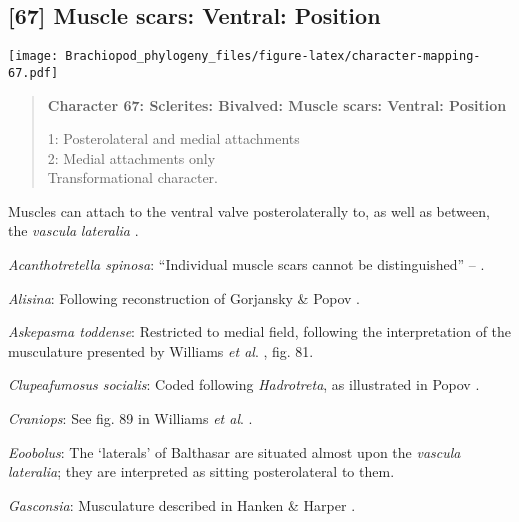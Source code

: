\documentclass[openany]{book}
\theoremstyle{definition}
\theoremstyle{definition}
\theoremstyle{definition}
\theoremstyle{remark}
\begin{document}
\subsection*{{[}67{]} Muscle scars: Ventral:
Position}\label{muscle-scars-ventral-position}

\texttt{[image: Brachiopod\_phylogeny\_files/figure-latex/character-mapping-67.pdf]}

\begin{quote}
\textbf{Character 67: Sclerites: Bivalved: Muscle scars: Ventral:
Position}

1: Posterolateral and medial attachments\\
2: Medial attachments only\\
Transformational character.
\end{quote}

Muscles can attach to the ventral valve posterolaterally to, as well as
between, the \emph{vascula} \emph{lateralia}
\citep{Popov1992TheCambrian}.

\hypertarget{Acanthotretella_spinosa-coding-67}{}
\emph{Acanthotretella spinosa}: ``Individual muscle scars cannot be
distinguished'' -- \citet{Holmer2006Aspinose}.

\hypertarget{Alisina-coding-67}{}
\emph{Alisina}: Following reconstruction of Gorjansky \& Popov
\citeyearpar{Gorjansky1986Onthe}.

\hypertarget{Askepasma_toddense-coding-67}{}
\emph{Askepasma toddense}: Restricted to medial field, following the
interpretation of the musculature presented by Williams \emph{et al}.
\citeyearpar{Williams2000LinguliformeaCraniiformea}, fig. 81.

\hypertarget{Clupeafumosus_socialis-coding-67}{}
\emph{Clupeafumosus socialis}: Coded following \emph{Hadrotreta}, as
illustrated in Popov \citeyearpar{Popov1992TheCambrian}.

\hypertarget{Craniops-coding-67}{}
\emph{Craniops}: See fig. 89 in Williams \emph{et al}.
\citeyearpar{Williams2000LinguliformeaCraniiformea}.

\hypertarget{Eoobolus-coding-67}{}
\emph{Eoobolus}: The `laterals' of Balthasar \citeyearpar[fig.
5]{Balthasar2009Thebrachiopod} are situated almost upon the
\emph{vascula} \emph{lateralia}; they are interpreted as sitting
posterolateral to them.

\hypertarget{Gasconsia-coding-67}{}
\emph{Gasconsia}: Musculature described in Hanken \& Harper
\citeyearpar{Hanken1985Thetaxonomy}.
\end{document}
